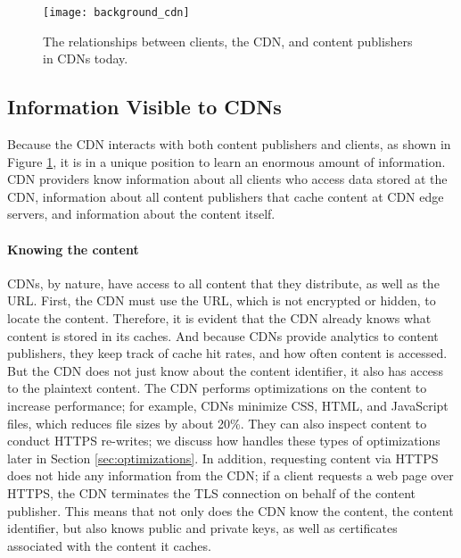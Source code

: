 \begin{figure}[t]
\centering
\texttt{[image: background\_cdn]}
\caption{The relationships between clients, the CDN, and content publishers in 
CDNs today.}
\label{fig:basic_cdn}
\end{figure}

\subsection{Information Visible to CDNs}
\label{sec:info}
Because the CDN interacts with both content publishers and clients, as shown in Figure \ref{fig:basic_cdn}, it is in a unique position 
to learn an enormous amount of information.  CDN providers know information about all clients who
access data stored at the CDN, information about all content publishers that cache content at 
CDN edge servers, and information about the content itself.

\paragraph{Knowing the content}  CDNs, by nature, have access to all content that they distribute, as well as 
the URL.  First, the CDN must use the URL, which is not 
encrypted or hidden, to locate the content. Therefore, it is evident that the CDN already knows what content is 
stored in its caches.  And because CDNs provide analytics to content publishers, they keep track of cache hit 
rates, and how often content is accessed.  But the CDN does not just know about the content identifier, it also 
has access to the plaintext content.  The CDN performs optimizations on the content to increase performance; 
for example, CDNs minimize CSS, HTML, and JavaScript files, which reduces file sizes by about 20\%.  They can 
also inspect content to conduct HTTPS re-writes; we discuss how \system{} handles these types of optimizations later 
in Section \ref{sec:optimizations}. In addition, requesting content via HTTPS does not hide any information 
from the CDN; if a client requests a web page over HTTPS, the CDN terminates the TLS connection on behalf of the 
content publisher.  This means that not only does the CDN know the content, the content identifier, but also knows 
public and private keys, as well as certificates associated with the content it caches.  

